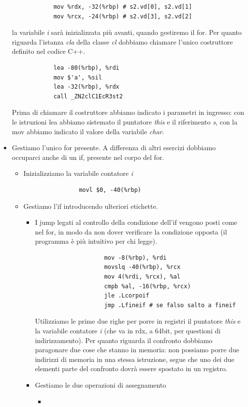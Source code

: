\begin{itemize}
\begin{verbatim}
			mov %rdx, -32(%rbp) # s2.vd[0], s2.vd[1]
			mov %rcx, -24(%rbp) # s2.vd[3], s2.vd[2]
		\end{verbatim}
		la variabile \emph{i} sarà inizializzata più avanti, quando gestiremo il for. Per quanto riguarda l'istanza \emph{cla} della classe \emph{cl} dobbiamo chiamare l'unico costruttore definito nel codice C++. 
		\begin{verbatim}
			lea -80(%rbp), %rdi
			mov $'a', %sil
			lea -32(%rbp), %rdx
			call _ZN2clC1EcR3st2
		\end{verbatim}
		Prima di chiamare il costruttore abbiamo indicato i parametri in ingresso: con le istruzioni lea abbiamo sistemato il puntatore \emph{this} e il riferimento \emph{s}, con la mov abbiamo indicato il valore della variabile \emph{char}. 
		\item Gestiamo l'unico for presente. A differenza di altri esercizi dobbiamo occuparci anche di un if, presente nel corpo del for.
		\begin{itemize}
			\item Inizializziamo la variabile contatore \emph{i}
			\begin{verbatim}
				movl $0, -40(%rbp)
			\end{verbatim}
			\item Gestiamo l'if introducendo ulteriori etichette. 
			\begin{itemize}
				\item I jump legati al controllo della condizione dell'if vengono posti come nel for, in modo da non dover verificare la condizione opposta (il programma è più intuitivo per chi legge).
				\begin{verbatim}
					mov -8(%rbp), %rdi
					movslq -40(%rbp), %rcx 
					mov 4(%rdi, %rcx), %al 
					cmpb %al, -16(%rbp, %rcx)
					jle .Lcorpoif
					jmp .Lfineif # se falso salto a fineif
				\end{verbatim}
				Utilizziamo le prime due righe per porre in registri il puntatore \emph{this} e la variabile contatore \emph{i} (che va in rdx, a 64bit, per questioni di indirizzamento). Per quanto riguarda il confronto dobbiamo paragonare due cose che stanno in memoria: non possiamo porre due indirizzi di memoria in una stessa istruzione, segue che uno dei due elementi parte del confronto dovrà essere spostato in un registro.
				\item Gestiamo le due operazioni di assegnamento
				\begin{itemize}
					\item 
					\begin{verbatim} 

\end{verbatim}
\end{itemize}
\end{itemize}
\end{itemize}
\end{itemize}
